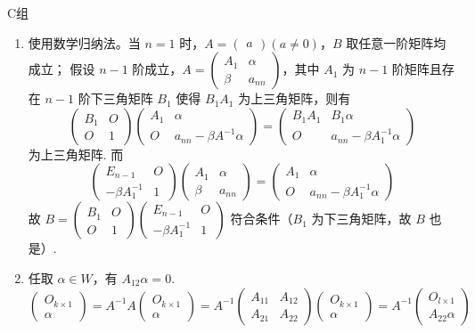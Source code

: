\centerline{\heiti C组}
\begin{enumerate}
    \item 使用数学归纳法。当 $n=1$ 时，$A=\begin{pmatrix}a\end{pmatrix}(a\neq 0)$，$B$ 取任意一阶矩阵均成立；
    假设 $n-1$ 阶成立，$A = \begin{pmatrix}A_1 & \alpha \\ \beta & a_{nn}\end{pmatrix}$，其中 $A_1$ 为 $n-1$ 阶矩阵且存在 $n-1$ 阶下三角矩阵 $B_1$ 使得 $B_1A_1$ 为上三角矩阵，则有 
    \[\begin{pmatrix}B_1 & O \\ O & 1\end{pmatrix}\begin{pmatrix}A_1 & \alpha \\ O & a_{nn}-\beta A^{-1}\alpha\end{pmatrix} = \begin{pmatrix}B_1A_1 & B_1\alpha \\ O & a_{nn}-\beta A_1^{-1}\alpha\end{pmatrix}\]为上三角矩阵.
    而 \[\begin{pmatrix}E_{n-1} & O \\ -\beta A_1^{-1} & 1\end{pmatrix}\begin{pmatrix}A_1 & \alpha \\ \beta & a_{nn}\end{pmatrix}=\begin{pmatrix}A_1 & \alpha \\ O & a_{nn}-\beta A_1^{-1} \alpha\end{pmatrix}\]
    故 $B=\begin{pmatrix}B_1 & O \\ O & 1\end{pmatrix}\begin{pmatrix}E_{n-1} & O \\ -\beta A_1^{-1} & 1\end{pmatrix}$ 符合条件（$B_1$ 为下三角矩阵，故 $B$ 也是）.
    \item 任取 $\alpha\in W$，有 $A_{12}\alpha=0$.
    \[\begin{pmatrix}O_{k\times 1} \\ \alpha\end{pmatrix}=A^{-1}A\begin{pmatrix}O_{k\times 1} \\ \alpha\end{pmatrix}=A^{-1}\begin{pmatrix}A_{11} & A_{12} \\ A_{21} & A_{22}\end{pmatrix}\begin{pmatrix}O_{k\times 1} \\ \alpha\end{pmatrix}=A^{-1}\begin{pmatrix}O_{l\times 1} \\ A_{22}\alpha\end{pmatrix}\]

\end{enumerate}

